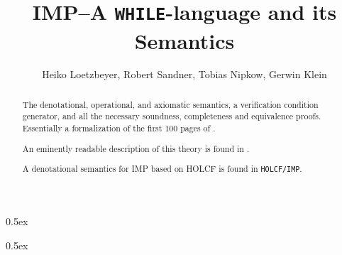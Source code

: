 \documentclass[a4wide]{article}
\begin{document}
\title{IMP--A {\tt WHILE}-language and its Semantics}
\author{Heiko Loetzbeyer, Robert Sandner, Tobias Nipkow, Gerwin Klein}
\maketitle

\parindent 0pt\parskip 0.5ex

\begin{abstract}\noindent
The denotational, operational, and axiomatic semantics, a verification
condition generator, and all the necessary soundness, completeness and
equivalence proofs. Essentially a formalization of the first 100 pages
of \cite{Winskel}.

An eminently readable description of this theory is found in \cite{Nipkow}.

A denotational semantics for IMP based on HOLCF is found in {\tt HOLCF/IMP}.
\end{abstract}

\tableofcontents

\parindent 0pt\parskip 0.5ex





\end{document}
